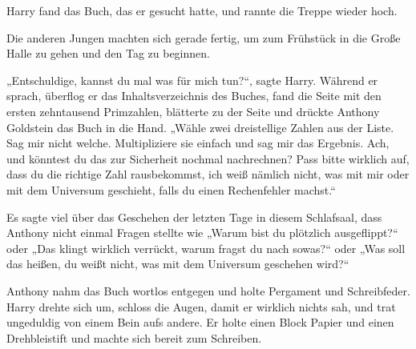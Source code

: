 Harry fand das Buch, das er gesucht hatte, und rannte die Treppe wieder hoch.

Die anderen Jungen machten sich gerade fertig, um zum Frühstück in die Große Halle zu gehen und den Tag zu beginnen.

„Entschuldige, kannst du mal was für mich tun?“, sagte Harry. Während er sprach, überflog er das Inhaltsverzeichnis des Buches, fand die Seite mit den ersten zehntausend Primzahlen, blätterte zu der Seite und drückte Anthony Goldstein das Buch in die Hand. „Wähle zwei dreistellige Zahlen aus der Liste. Sag mir nicht welche. Multipliziere sie einfach und sag mir das Ergebnis. Ach, und könntest du das zur Sicherheit nochmal nachrechnen? Pass bitte wirklich auf, dass du die richtige Zahl rausbekommst, ich weiß nämlich nicht, was mit mir oder mit dem Universum geschieht, falls du einen Rechenfehler machst.“

Es sagte viel über das Geschehen der letzten Tage in diesem Schlafsaal, dass Anthony nicht einmal Fragen stellte wie „Warum bist du plötzlich ausgeflippt?“ oder „Das klingt wirklich verrückt, warum fragst du nach sowas?“ oder „Was soll das heißen, du weißt nicht, was mit dem Universum geschehen wird?“

Anthony nahm das Buch wortlos entgegen und holte Pergament und Schreibfeder. Harry drehte sich um, schloss die Augen, damit er wirklich nichts sah, und trat ungeduldig von einem Bein aufs andere. Er holte einen Block Papier und einen Drehbleistift und machte sich bereit zum Schreiben.

